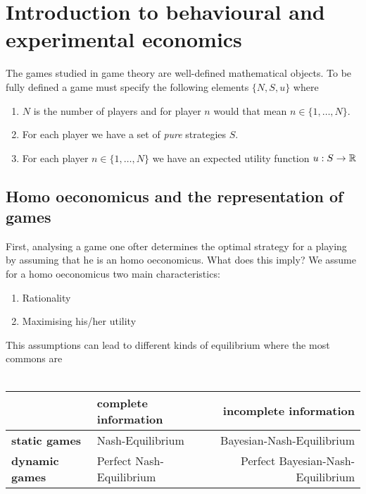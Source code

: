 

\chapter{Introduction to behavioural and experimental economics}

The games studied in game theory are well-defined mathematical objects. To be fully defined a game must specify the following elements $\{ N, S, u \}$ where

	\begin{enumerate}
		\item $N$ is the number of players and for player $n$ would that mean $n \in \{ 1, \dotsc, N \}$.
		\item For each player we have a set of \textit{pure} strategies $S$.
		\item For each player $n \in \{1, \dotsc, N \}$ we have an expected utility function $u : S \rightarrow \mathbb{R}$
	\end{enumerate}


\section{Homo oeconomicus and the representation of games} 
First, analysing a game one ofter determines the optimal strategy for a playing by assuming that he is an homo oeconomicus. What does this imply? We assume for a homo oeconomicus two main characteristics:
\begin{enumerate}
	\item Rationality
	\item Maximising his/her utility
\end{enumerate}


This assumptions can lead to different kinds of equilibrium where the most commons are \\ \\
\begin{tabular}{|l|l|r|}
	\hline\hline
  			& {\textbf{complete information}} & {\textbf{incomplete information}} \\
                                                    \hline
   \textbf{static games} & Nash-Equilibrium & Bayesian-Nash-Equilibrium\arrayrulewidth2pt \\
                                               \cline{1-3}
   \textbf{dynamic games} & Perfect Nash-Equilibrium & Perfect Bayesian-Nash-Equilibrium \\ \hline\hline
\end{tabular}

